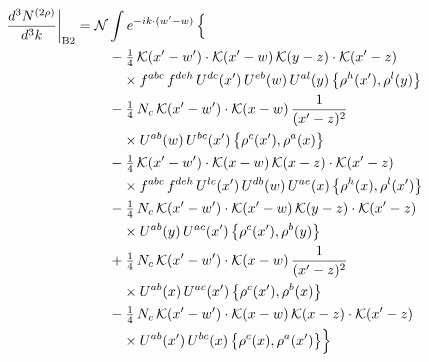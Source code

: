 \documentclass[10pt]{article}
\numberwithin{equation}{section}
\newcommand{\KK}{\mathcal K}
\newcommand{\NN}{\mathcal N}
\begin{document}
\begin{align}
\frac{d^3N^{(2\rho)}}{d^3k}\bigg|_{\rm B2}={}&\NN\int e^{-ik\cdot(w'-w)}\,\Big\{\notag\\
&\quad -\tfrac14\,\KK(x'-w')\cdot\KK(x'-w)\,\KK(y-z)\cdot\KK(x'-z)\notag\\
&\qquad\times f^{abc}\,f^{deh}\,U^{dc}(x')\,U^{eb}(w)\,U^{al}(y)\,\big\{\rho^{h}(x'),\rho^{l}(y)\big\}\notag\\
&\quad -\tfrac14\,N_{c}\,\KK(x'-w')\cdot\KK(x-w)\,\frac{1}{(x'-z)^2}\notag\\
&\qquad\times U^{ab}(w)\,U^{bc}(x')\,\big\{\rho^{c}(x'),\rho^{a}(x)\big\}\notag\\
&\quad -\tfrac14\,\KK(x'-w')\cdot\KK(x-w)\,\KK(x-z)\cdot\KK(x'-z)\notag\\
&\qquad\times f^{abc}\,f^{deh}\,U^{lc}(x')\,U^{db}(w)\,U^{ae}(x)\,\big\{\rho^{h}(x),\rho^{l}(x')\big\}\notag\\
&\quad -\tfrac14\,N_{c}\,\KK(x'-w')\cdot\KK(x'-w)\,\KK(y-z)\cdot\KK(x'-z)\notag\\
&\qquad\times U^{ab}(y)\,U^{ac}(x')\,\big\{\rho^{c}(x'),\rho^{b}(y)\big\}\notag\\
&\quad +\tfrac14\,N_{c}\,\KK(x'-w')\cdot\KK(x-w)\,\frac{1}{(x'-z)^2}\notag\\
&\qquad\times U^{ab}(x)\,U^{ac}(x')\,\big\{\rho^{c}(x'),\rho^{b}(x)\big\}\notag\\
&\quad -\tfrac14\,N_{c}\,\KK(x'-w')\cdot\KK(x-w)\,\KK(x-z)\cdot\KK(x'-z)\notag\\
&\qquad\times U^{ab}(x')\,U^{bc}(x)\,\big\{\rho^{c}(x),\rho^{a}(x')\big\}\Big\}\label{R:eq:sum-B2}
\end{align}
\end{document}
